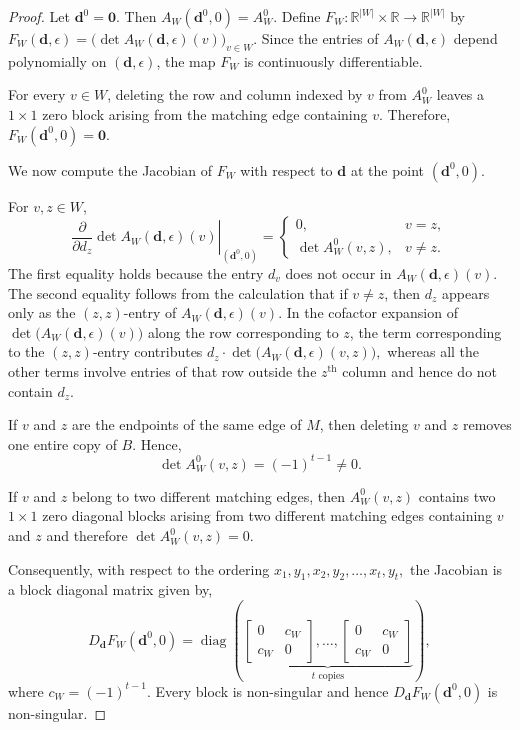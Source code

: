 \documentclass[10pt,a4paper]{amsart}
\begin{document}
\begin{proof}
Let \(\mathbf d^0=\mathbf 0\). Then
\(
A_W(\mathbf d^0,0)=A_W^0.
\)
Define
\(
F_W:\mathbb R^{|W|}\times\mathbb R
\longrightarrow
\mathbb R^{|W|}
\)
by
\(
F_W(\mathbf d,\epsilon)
=
\bigl(
\det A_W(\mathbf d,\epsilon)(v)
\bigr)_{v\in W}.
\)
Since the entries of \(A_W(\mathbf d,\epsilon)\) depend polynomially
on \((\mathbf d,\epsilon)\), the map \(F_W\) is continuously
differentiable.

For every \(v\in W\), deleting the row and column indexed by \(v\)
from \(A_W^0\) leaves a \(1\times1\) zero block arising from the
matching edge containing \(v\). Therefore,
\(
F_W(\mathbf d^0,0)=\mathbf 0.
\)

We now compute the Jacobian of \(F_W\) with respect to \(\mathbf d\) at the point \((\mathbf{d}^0,0)\).

For \(v,z\in W\),
\[
\left.
\frac{\partial}{\partial d_z}
\det A_W(\mathbf d,\epsilon)(v)
\right|_{(\mathbf d^0,0)}
=
\begin{cases}
0, & v=z,\\[1mm]
\det A_W^0(v,z), & v\neq z.
\end{cases}
\]
The first equality holds because the entry \(d_v\) does not occur in
\(A_W(\mathbf d,\epsilon)(v)\). 
The second equality follows from the calculation that if \(v\neq z\), then \(d_z\) appears only as the \((z,z)\)-entry of
\(A_W(\mathbf{d},\epsilon)(v)\). In the cofactor expansion of
\(\det\bigl(A_W(\mathbf{d},\epsilon)(v)\bigr)\) along the row corresponding to \(z\), the term
corresponding to the \((z,z)\)-entry contributes
\(
d_z\cdot\det\bigl(A_W(\mathbf{d},\epsilon)(v,z)\bigr),
\)
whereas all the other terms involve entries of that row outside the
\(z^{\text{th}}\) column and hence do not contain \(d_z\).

If \(v\) and \(z\) are the endpoints of the same edge of \(M\), then
deleting \(v\) and \(z\) removes one entire copy of \(B\). Hence,
\[
\det A_W^0(v,z)=(-1)^{t-1}\neq0.
\]

If \(v\) and \(z\) belong to two different matching edges, then
\(A_W^0(v,z)\) contains two \(1\times1\) zero diagonal blocks arising from two different matching edges containing $v$ and $z$  and
therefore
\(
\det A_W^0(v,z)=0.
\)

Consequently, with respect to the ordering
\(
x_1,y_1,x_2,y_2,\ldots,x_t,y_t,
\)
the Jacobian is a block diagonal matrix given by,
\[
D_{\mathbf d}F_W(\mathbf d^0,0)
=
\operatorname{diag}
\left(
\underbrace{
\begin{bmatrix}
0&c_W\\
c_W&0
\end{bmatrix},
\ldots,
\begin{bmatrix}
0&c_W\\
c_W&0
\end{bmatrix}
}_{t\text{ copies}}
\right),
\]
where
\(
c_W=(-1)^{t-1}.
\)
Every block is non-singular and hence
\(
D_{\mathbf d}F_W(\mathbf d^0,0)
\)
is non-singular.


\end{proof}
\end{document}
